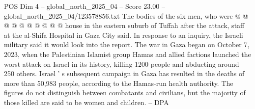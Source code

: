 \begin{textsample}{POS Dim 4 – global\_north\_2025\_04 – Score 23.00 – global\_north\_2025\_04/123578856.txt}
The bodies of the six men, who were @ @ @ @ @ @ @ @ @ @ house in the eastern suburb of Tuffah after the attack, staff at the al-Shifa Hospital in Gaza City said.
In response to an inquiry, the Israeli military said it would look into the report.
The war in Gaza began on October 7, 2023, when the Palestinian Islamist group Hamas and allied factions launched the worst attack on Israel in its history, killing 1200 people and abducting around 250 others.
Israel ' s subsequent campaign in Gaza has resulted in the deaths of more than 50,983 people, according to the Hamas-run health authority.
The figures do not distinguish between combatants and civilians, but the majority of those killed are said to be women and children. -- DPA

\end{textsample}
